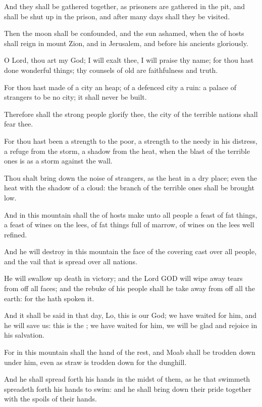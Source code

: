 \Verse And they shall be gathered together, as prisoners are gathered in the pit, and shall be shut up in the prison, and after many days shall they be visited.

\Verse Then the moon shall be confounded, and the sun ashamed, when the \LORD of hosts shall reign in mount Zion, and in Jerusalem, and before his ancients gloriously.


\Chapter
\Verse O Lord, thou art my God; I will exalt thee, I will praise thy name; for thou hast done wonderful things; thy counsels of old are faithfulness and truth.

\Verse For thou hast made of a city an heap; of a defenced city a ruin: a palace of strangers to be no city; it shall never be built.

\Verse Therefore shall the strong people glorify thee, the city of the terrible nations shall fear thee.

\Verse For thou hast been a strength to the poor, a strength to the needy in his distress, a refuge from the storm, a shadow from the heat, when the blast of the terrible ones is as a storm against the wall.

\Verse Thou shalt bring down the noise of strangers, as the heat in a dry place; even the heat with the shadow of a cloud: the branch of the terrible ones shall be brought low.

\Verse And in this mountain shall the \LORD of hosts make unto all people a feast of fat things, a feast of wines on the lees, of fat things full of marrow, of wines on the lees well refined.

\Verse And he will destroy in this mountain the face of the covering cast over all people, and the vail that is spread over all nations.

\Verse He will swallow up death in victory; and the Lord GOD will wipe away tears from off all faces; and the rebuke of his people shall he take away from off all the earth: for the \LORD hath spoken it.

\Verse And it shall be said in that day, Lo, this is our God; we have waited for him, and he will save us: this is the \LORD; we have waited for him, we will be glad and rejoice in his salvation.

\Verse For in this mountain shall the hand of the \LORD rest, and Moab shall be trodden down under him, even as straw is trodden down for the dunghill.

\Verse And he shall spread forth his hands in the midst of them, as he that swimmeth spreadeth forth his hands to swim: and he shall bring down their pride together with the spoils of their hands.

